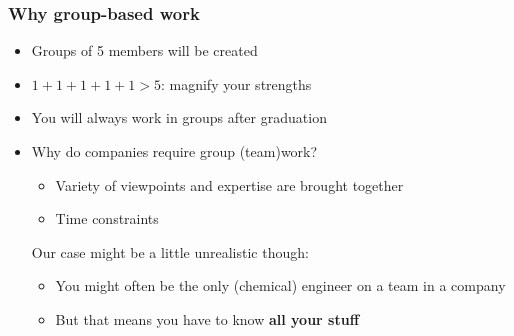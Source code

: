 % 
% 

\begin{frame}\frametitle{Why group-based work}
	\begin{itemize}
		\item	Groups of 5 members will be created
		\item	$1+1+1+1+1 > 5$: magnify your strengths
		\item	You will always work in groups after graduation
		\item	Why do companies require group (team)work? 
		\begin{itemize}
			\item	Variety of viewpoints and expertise are brought together
			\item	Time constraints
		\end{itemize}	
		\vspace{12pt}
		\pause
		Our case might be a little unrealistic though:
		\begin{itemize}
			\item	You might often be the only (chemical) engineer on a team in a company
			\item	But that means you have to know \textbf{all your stuff}
		\end{itemize}
	\end{itemize}
\end{frame}

